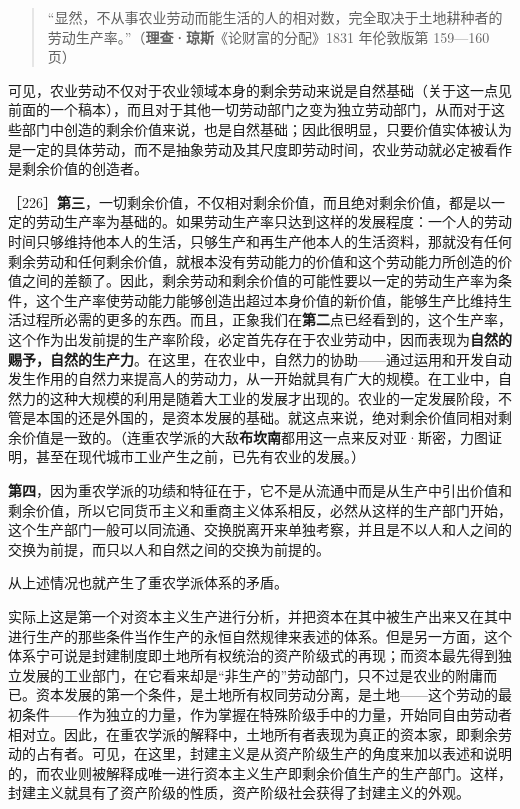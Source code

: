 \begin{quote}“显然，不从事农业劳动而能生活的人的相对数，完全取决于土地耕种者的劳动生产率。”（\textbf{理查·琼斯}《论财富的分配》1831 年伦敦版第 159—160 页）\end{quote}

可见，农业劳动不仅对于农业领域本身的剩余劳动来说是自然基础（关于这一点见前面的一个稿本），而且对于其他一切劳动部门之变为独立劳动部门，从而对于这些部门中创造的剩余价值来说，也是自然基础；因此很明显，只要价值实体被认为是一定的具体劳动，而不是抽象劳动及其尺度即劳动时间，农业劳动就必定被看作是剩余价值的创造者。

［226］\textbf{第三}，一切剩余价值，不仅相对剩余价值，而且绝对剩余价值，都是以一定的劳动生产率为基础的。如果劳动生产率只达到这样的发展程度：一个人的劳动时间只够维持他本人的生活，只够生产和再生产他本人的生活资料，那就没有任何剩余劳动和任何剩余价值，就根本没有劳动能力的价值和这个劳动能力所创造的价值之间的差额了。因此，剩余劳动和剩余价值的可能性要以一定的劳动生产率为条件，这个生产率使劳动能力能够创造出超过本身价值的新价值，能够生产比维持生活过程所必需的更多的东西。而且，正象我们在\textbf{第二}点已经看到的，这个生产率，这个作为出发前提的生产率阶段，必定首先存在于农业劳动中，因而表现为\textbf{自然的赐予，自然的生产力}。在这里，在农业中，自然力的协助——通过运用和开发自动发生作用的自然力来提高人的劳动力，从一开始就具有广大的规模。在工业中，自然力的这种大规模的利用是随着大工业的发展才出现的。农业的一定发展阶段，不管是本国的还是外国的，是资本发展的基础。就这点来说，绝对剩余价值同相对剩余价值是一致的。（连重农学派的大敌\textbf{布坎南}都用这一点来反对亚·斯密，力图证明，甚至在现代城市工业产生之前，已先有农业的发展。）

\textbf{第四}，因为重农学派的功绩和特征在于，它不是从流通中而是从生产中引出价值和剩余价值，所以它同货币主义和重商主义体系相反，必然从这样的生产部门开始，这个生产部门一般可以同流通、交换脱离开来单独考察，并且是不以人和人之间的交换为前提，而只以人和自然之间的交换为前提的。


从上述情况也就产生了重农学派体系的矛盾。

实际上这是第一个对资本主义生产进行分析，并把资本在其中被生产出来又在其中进行生产的那些条件当作生产的永恒自然规律来表述的体系。但是另一方面，这个体系宁可说是封建制度即土地所有权统治的资产阶级式的再现；而资本最先得到独立发展的工业部门，在它看来却是“非生产的”劳动部门，只不过是农业的附庸而已。资本发展的第一个条件，是土地所有权同劳动分离，是土地——这个劳动的最初条件——作为独立的力量，作为掌握在特殊阶级手中的力量，开始同自由劳动者相对立。因此，在重农学派的解释中，土地所有者表现为真正的资本家，即剩余劳动的占有者。可见，在这里，封建主义是从资产阶级生产的角度来加以表述和说明的，而农业则被解释成唯一进行资本主义生产即剩余价值生产的生产部门。这样，封建主义就具有了资产阶级的性质，资产阶级社会获得了封建主义的外观。

